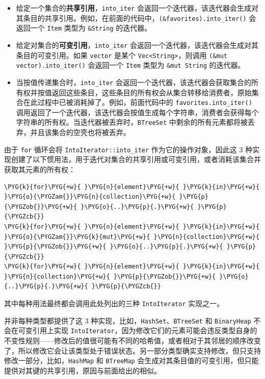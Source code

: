 \begin{itemize}
\item 给定一个集合的\textbf{共享引用}，\texttt{into\_iter} 会返回一个迭代器，该迭代器会生成对其条目的共享引用。例如，在前面的代码中，\texttt{(\&favorites).into\_iter()} 会返回一个 \texttt{Item} 类型为 \texttt{\&String} 的迭代器。
\item 给定对集合的\textbf{可变引用}，\texttt{into\_iter} 会返回一个迭代器，该迭代器会生成对其条目的可变引用。如果 \texttt{vector} 是某个 \texttt{Vec<String>}，则调用 \texttt{(\&mut vector).into\_iter()} 会返回一个 \texttt{Item} 类型为 \texttt{\&mut String} 的迭代器。
\item 当按值传递集合时，\texttt{into\_iter} 会返回一个迭代器，该迭代器会获取集合的所有权并按值返回这些条目，这些条目的所有权会从集合转移给消费者，原始集合在此过程中已被消耗掉了。例如，前面代码中的 \texttt{favorites.into\_iter()} 调用返回了一个迭代器，该迭代器会按值生成每个字符串，消费者会获得每个字符串的所有权。当迭代器被丢弃时，\texttt{BTreeSet} 中剩余的所有元素都将被丢弃，并且该集合的空壳也将被丢弃。
\end{itemize}

由于 \texttt{for} 循环会将 \texttt{IntoIterator::into\_iter} 作为它的操作对象，因此这 3 种实现创建了以下惯用法，用于迭代对集合的共享引用或可变引用，或者消耗该集合并获取其元素的所有权：

\begin{Verbatim}[commandchars=\\\{\},breaklines=true,breakanywhere=true,fontsize=\codefont,xleftmargin=17bp]
\PYG{k}{for}\PYG{+w}{ }\PYG{n}{element}\PYG{+w}{ }\PYG{k}{in}\PYG{+w}{ }\PYG{o}{\PYGZam{}}\PYG{n}{collection}\PYG{+w}{ }\PYG{p}{\PYGZob{}}\PYG{+w}{ }\PYG{o}{..}\PYG{p}{.}\PYG{+w}{ }\PYG{p}{\PYGZcb{}}
\PYG{k}{for}\PYG{+w}{ }\PYG{n}{element}\PYG{+w}{ }\PYG{k}{in}\PYG{+w}{ }\PYG{o}{\PYGZam{}}\PYG{k}{mut}\PYG{+w}{ }\PYG{n}{collection}\PYG{+w}{ }\PYG{p}{\PYGZob{}}\PYG{+w}{ }\PYG{o}{..}\PYG{p}{.}\PYG{+w}{ }\PYG{p}{\PYGZcb{}}
\PYG{k}{for}\PYG{+w}{ }\PYG{n}{element}\PYG{+w}{ }\PYG{k}{in}\PYG{+w}{ }\PYG{n}{collection}\PYG{+w}{ }\PYG{p}{\PYGZob{}}\PYG{+w}{ }\PYG{o}{..}\PYG{p}{.}\PYG{+w}{ }\PYG{p}{\PYGZcb{}}
\end{Verbatim}

其中每种用法最终都会调用此处列出的三种 \texttt{IntoIterator} 实现之一。

并非每种类型都提供了这 3 种实现，比如，\texttt{HashSet}、\texttt{BTreeSet} 和 \texttt{BinaryHeap} 不会在可变引用上实现 \texttt{IntoIterator}，因为修改它们的元素可能会违反类型自身的不变性规则——修改后的值很可能有不同的哈希值，或者相对于其邻居的顺序改变了，所以修改它会让该类型处于错误状态。另一部分类型确实支持修改，但只支持修改一部分，比如，\texttt{HashMap} 和 \texttt{BTreeMap} 会生成对其条目值的可变引用，但只能提供对其键的共享引用，原因与前面给出的相似。

